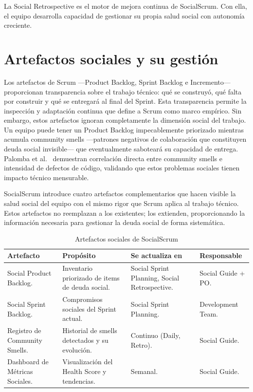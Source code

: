 \FloatBarrier

La Social Retrospective es el motor de mejora continua de SocialScrum. Con ella, el equipo desarrolla capacidad de gestionar su propia salud social con autonomía creciente.

\section{Artefactos sociales y su gestión}

Los artefactos de Scrum ---Product Backlog, Sprint Backlog e Incremento--- proporcionan transparencia sobre el trabajo técnico: qué se construyó, qué falta por construir y qué se entregará al final del Sprint. Esta transparencia permite la inspección y adaptación continua que define a Scrum como marco empírico. Sin embargo, estos artefactos ignoran completamente la dimensión social del trabajo. Un equipo puede tener un Product Backlog impecablemente priorizado mientras acumula community smells \cite{caballero2022communitysmells} ---patrones negativos de colaboración que constituyen deuda social invisible--- que eventualmente saboteará su capacidad de entrega. Palomba et al.\ \cite{palomba2021communitysmells} demuestran correlación directa entre community smells e intensidad de defectos de código, validando que estos problemas sociales tienen impacto técnico mensurable.

SocialScrum introduce cuatro artefactos complementarios que hacen visible la salud social del equipo con el mismo rigor que Scrum aplica al trabajo técnico. Estos artefactos no reemplazan a los existentes; los extienden, proporcionando la información necesaria para gestionar la deuda social de forma sistemática.

\begin{table}[h]
    \centering
    \small
    \begin{tabularx}{\linewidth}{|X|X|X|p{3.2cm}|}
        \hline
        \textbf{Artefacto}              & \textbf{Propósito}                              & \textbf{Se actualiza en}                      & \textbf{Responsable} \\
        \hline
        Social Product Backlog.         & Inventario priorizado de items de deuda social. & Social Sprint Planning, Social Retrospective. & Social Guide + PO.   \\
        \hline
        Social Sprint Backlog.          & Compromisos sociales del Sprint actual.         & Social Sprint Planning.                       & Development Team.    \\
        \hline
        Registro de Community Smells.   & Historial de smells detectados y su evolución.  & Continuo (Daily, Retro).                      & Social Guide.        \\
        \hline
        Dashboard de Métricas Sociales. & Visualización del Health Score y tendencias.    & Semanal.                                      & Social Guide.        \\
        \hline
    \end{tabularx}
    \caption{Artefactos sociales de SocialScrum}
    \label{tab:artefactos-sociales}
\end{table}

